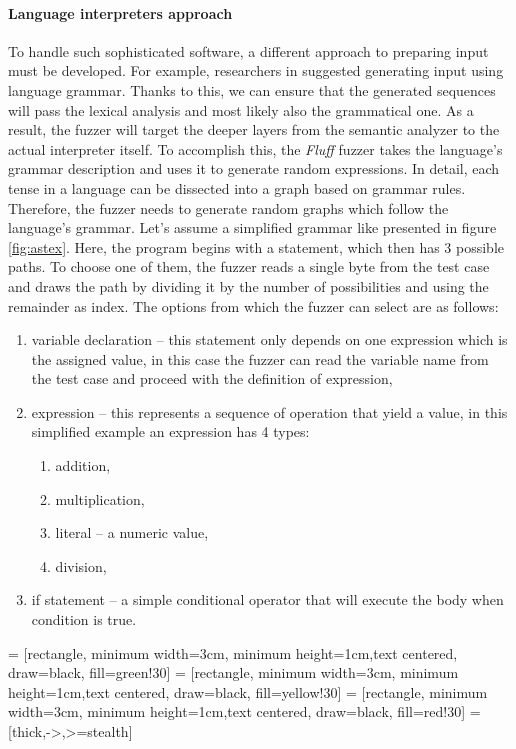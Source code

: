 \paragraph{Language interpreters approach}
To handle such sophisticated software, a different approach to preparing input must be developed. For example, researchers in \cite{dominiak2019efficient} suggested generating input using language grammar. Thanks to this, we can ensure that the generated sequences will pass the lexical analysis and most likely also the grammatical one. As a result, the fuzzer will target the deeper layers from the semantic analyzer to the actual interpreter itself. To accomplish this, the \textit{Fluff} fuzzer takes the language's grammar description and uses it to generate random expressions. In detail, each tense in a language can be dissected into a graph based on grammar rules. Therefore, the fuzzer needs to generate random graphs which follow the language's grammar. Let's assume a simplified grammar like presented in figure \ref{fig:astex}. Here, the program begins with a statement, which then has 3 possible paths. To choose one of them, the fuzzer reads a single byte from the test case and draws the path by dividing it by the number of possibilities and using the remainder as index. The options from which the fuzzer can select are as follows:
\begin{enumerate}
    \item variable declaration – this statement only depends on one expression which is the assigned value, in this case the fuzzer can read the variable name from the test case and proceed with the definition of expression,
    \item expression – this represents a sequence of operation that yield a value, in this simplified example an expression has 4 types:
    \begin{enumerate}
        \item addition,
        \item multiplication,
        \item literal – a numeric value,
        \item division,
    \end{enumerate}
    \item if statement – a simple conditional operator that will execute the body when condition is true.
\end{enumerate}

 = [rectangle, minimum width=3cm, minimum height=1cm,text centered, draw=black, fill=green!30]
 = [rectangle, minimum width=3cm, minimum height=1cm,text centered, draw=black, fill=yellow!30]
 = [rectangle, minimum width=3cm, minimum height=1cm,text centered, draw=black, fill=red!30]
 = [thick,->,>=stealth]


